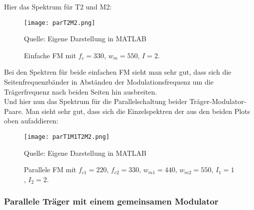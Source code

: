 Hier das Spektrum für T2 und M2:
\FloatBarrier
\begin{figure} [ht]
\centering
  \texttt{[image: parT2M2.png]}
\caption{Einfache FM mit $f_c = 330$, $w_m = 550$, $I = 2$. }
Quelle: Eigene Darstellung in MATLAB
\end{figure}
\FloatBarrier
Bei den Spektren für beide einfachen FM sieht man sehr gut, dass sich die Seitenfrequenzbänder in Abständen der Modulationsfrequenz um die Trägerfrequenz nach beiden Seiten hin ausbreiten.\\
Und hier nun das Spektrum für die Parallelschaltung beider Träger-Modulator-Paare. Man sieht sehr gut, dass sich die Einzelspektren der aus den beiden Plots oben aufaddieren: 
\FloatBarrier
\begin{figure} [ht]
\centering
  \texttt{[image: parT1M1T2M2.png]}
\caption{Parallele FM mit $f_{c1} = 220$, $f_{c2} = 330$, $w_{m1} = 440$, $w_{m2} = 550$, $I_1 = 1$, $I_2 = 2$. }
Quelle: Eigene Darstellung in MATLAB
\end{figure}
\FloatBarrier

\subsubsection{Parallele Träger mit einem gemeinsamen Modulator}

